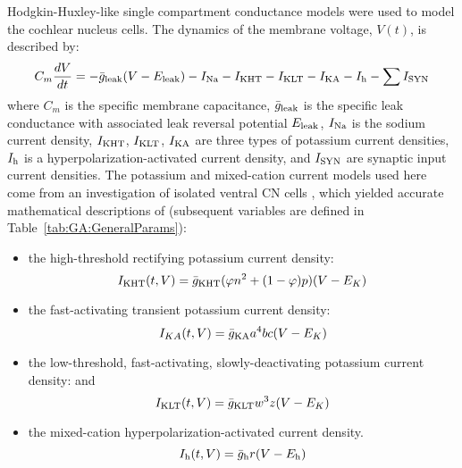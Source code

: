 Hodgkin-Huxley-like single compartment conductance models
\citep{HodgkinHuxley:1952a} were used to model the cochlear nucleus
cells. The dynamics of the membrane voltage, $V(t)$, is described by:
\begin{equation} \label{eq:GA:5} 
C_{m} \frac{dV}{dt} =-\bar{g}_{{\rm
      leak}} (V-E_{{\rm leak}} )-I_{{\rm Na}} -I_{{\rm KHT}} -I_{{\rm
      KLT}} -I_{{\rm KA}} -I_{{\rm h}} -\sum I_{{\rm SYN}}
\end{equation}
\noindent where $C_{m}$ is the specific membrane capacitance,
$\bar{g}_{{\rm leak}} $ is the specific leak conductance with
associated leak reversal potential $E_{{\rm leak}} $, $I_{{\rm Na}} $
is the sodium current density, $I_{{\rm KHT}} $, $I_{{\rm KLT}} $,
$I_{{\rm KA}} $ are three types of potassium current densities,
$I_{{\rm h}} $ is a hyperpolarization-activated current density, and
$I_{{\rm SYN}} $ are synaptic input current densities.  The potassium
and mixed-cation current models used here come from an investigation
of isolated ventral CN cells
\citep{RothmanManis:2003,RothmanManis:2003a,RothmanManis:2003b}, which
yielded accurate mathematical descriptions of (subsequent variables
are defined in Table~\ref{tab:GA:GeneralParams}):
\begin{itemize}
\item the high-threshold rectifying potassium current density:
  \begin{equation} \label{eq:GA:6} 
I_{{\rm KHT}}(t,V)=\bar{g}_{{\rm KHT}} (\varphi n^{2} + (1-\varphi ) p)(V-E_{K} )
  \end{equation}
\item the fast-activating transient potassium current density:
  \begin{equation} \label{eq:GA:7} 
I_{KA} (t,V)=\bar{g}_{{\rm KA}} a^{4} b c (V-E_{K})
  \end{equation}
\item the low-threshold, fast-activating, slowly-deactivating
  potassium current density: and
  \begin{equation} \label{eq:GA:8} 
I_{{\rm KLT}}(t,V)=\bar{g}_{{\rm KLT}} w^{3} z (V-E_{K} )
  \end{equation}
\item the mixed-cation hyperpolarization-activated current density.
  \begin{equation} \label{eq:GA:9} 
I_{{\rm h}} (t,V)=\bar{g}_{{\rm h}} r (V-E_{{\rm h}} )
  \end{equation}
\end{itemize}

